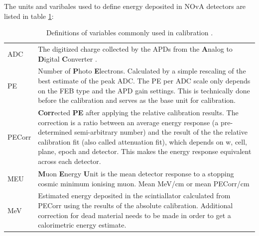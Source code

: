 \documentclass[12pt,a4paper]{article}
\begin{document}
The units and varibales used to define energy deposited in NOvA detectors are listed in table \ref{tabCalibrationVars}:
\begin{table}[!ht]
\centering
\def\arraystretch{1.4}
\begin{tabular}{m{} m{}}
ADC & The digitized charge collected by the APDs from the \textbf{A}nalog to \textbf{D}igital \textbf{C}onverter \cite{NOVA-doc-13518}.\\
PE & Number of \textbf{P}hoto \textbf{E}lectrons. Calculated by a simple rescaling of the best estimate of the peak ADC. The PE per ADC scale only depends on the FEB type and the APD gain settings. This is technically done before the calibration and serves as the base unit for calibration.\\
PECorr & \textbf{Corr}ected \textbf{PE} after applying the relative calibration results. The correction is a ratio between an average energy response (a pre-determined semi-arbitrary number) and the result of the the relative calibration fit (also called attenuation fit), which depends on w, cell, plane, epoch and detector. This makes the energy response equivalent across each detector.\\
MEU & \textbf{M}uon \textbf{E}nergy \textbf{U}nit is the mean detector response to a stopping cosmic minimum ionising muon.  Mean MeV/cm or mean PECorr/cm\\
MeV & Estimated energy deposited in the scintiallator calculated from PECorr using the results of the absolute calibration. Additional correction for dead material needs to be made in order to get a calorimetric energy estimate.
\end{tabular}
\caption{Definitions of variables commonly used in calibration \cite{NOVA-doc-13579,NOVA-doc-7410}.}
\label{tabCalibrationVars}
\end{table}
\end{document}
